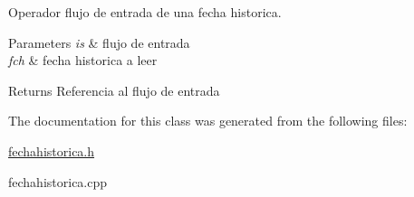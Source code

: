 Operador flujo de entrada de una fecha historica. 


\begin{DoxyParams}{Parameters}
{\em is} & flujo de entrada \\
\hline
{\em fch} & fecha historica a leer \\
\hline
\end{DoxyParams}
\begin{DoxyReturn}{Returns}
Referencia al flujo de entrada 
\end{DoxyReturn}


The documentation for this class was generated from the following files\+:\begin{DoxyCompactItemize}
\item 
\hyperlink{fechahistorica_8h}{fechahistorica.\+h}\item 
fechahistorica.\+cpp\end{DoxyCompactItemize}
